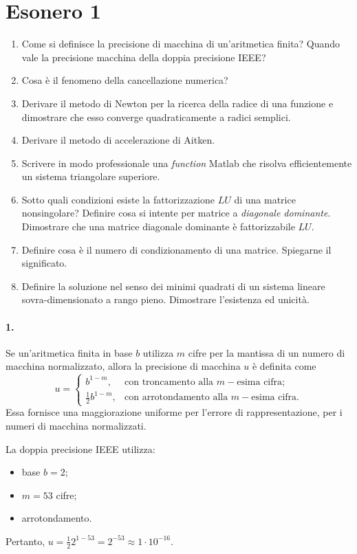 \section{Esonero 1}
\begin{enumerate}
    \item Come si definisce la precisione di macchina di un'aritmetica finita? Quando vale la precisione macchina della doppia precisione IEEE?
    \item Cosa è il fenomeno della cancellazione numerica?
    \item Derivare il metodo di Newton per la ricerca della radice di una funzione e dimostrare che esso converge quadraticamente a radici semplici.
    \item Derivare il metodo di accelerazione di Aitken.
    \item Scrivere in modo professionale una \textit{function} Matlab che risolva efficientemente un sistema triangolare superiore.
    \item Sotto quali condizioni esiste la fattorizzazione $LU$ di una matrice nonsingolare? Definire cosa si intente per matrice a \textit{diagonale dominante}. Dimostrare che una matrice diagonale dominante è fattorizzabile $LU$.
    \item Definire cosa è il numero di condizionamento di una matrice. Spiegarne il significato.
    \item Definire la soluzione nel senso dei minimi quadrati di un sistema lineare sovra-dimensionato a rango pieno. Dimostrare l'esistenza ed unicità.
\end{enumerate}

\paragraph{1.} Se un'aritmetica finita in base $b$ utilizza $m$ cifre per la mantissa di un numero di macchina normalizzato, allora la precisione di macchina $u$ è definita come
\begin{equation*}
    u=
    \begin{cases}
        b^{1-m},& \text{con troncamento alla $m-$esima cifra;}\\
        \frac{1}{2}b^{1-m}, & \text{con arrotondamento alla $m-$esima cifra.}
    \end{cases}
\end{equation*}
Essa fornisce una maggiorazione uniforme per l'errore di rappresentazione, per i numeri di macchina normalizzati.

\noindent La doppia precisione IEEE utilizza:
\begin{itemize}
    \item base $b=2$;
    \item $m=53$ cifre;
    \item arrotondamento.
\end{itemize}
Pertanto, $u=\frac{1}{2}2^{1-53}=2^{-53}\approx 1\cdot 10^{-16}$.

